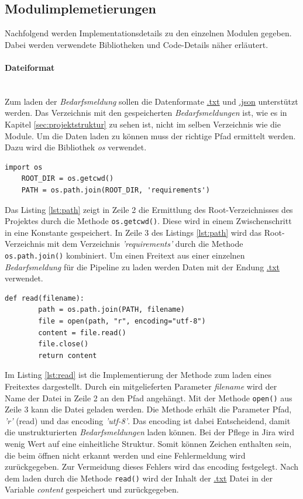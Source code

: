 \subsection{Modulimplemetierungen}
Nachfolgend werden Implementationsdetails zu den einzelnen Modulen gegeben. Dabei werden verwendete Bibliotheken und Code-Details näher erläutert.
\paragraph{Dateiformat}\mbox{}\\
Zum laden der \emph{Bedarfsmeldung} sollen die Datenformate \url{.txt} und \url{.json} unterstützt werden. Das Verzeichnis mit den gespeicherten \emph{Bedarfsmeldungen} ist, wie es in Kapitel \ref{sec:projektstruktur} zu sehen ist, nicht im selben Verzeichnis wie die Module. Um die Daten laden zu können muss der richtige Pfad ermittelt werden. Dazu wird die Bibliothek \emph{os} verwendet.
\begin{lstlisting}[caption={Teilimplementation des Moduls \emph{readRequirements.py}}, label=lst:path]
	import os
	ROOT_DIR = os.getcwd()
	PATH = os.path.join(ROOT_DIR, 'requirements') 
\end{lstlisting}
Das Listing \ref{lst:path} zeigt in Zeile 2 die Ermittlung des Root-Verzeichnisses des Projektes durch die Methode \lstinline{os.getcwd()}.
Diese wird in einem Zwischenschritt in eine Konstante gespeichert. In Zeile 3 des Listings \ref{lst:path} wird das Root-Verzeichnis mit dem Verzeichnis \emph{'requirements'} durch die Methode \lstinline{os.path.join()} kombiniert.
Um einen Freitext aus einer einzelnen \emph{Bedarfsmeldung} für die Pipeline zu laden werden Daten mit der Endung \url{.txt} verwendet.
\begin{lstlisting}[caption={Implementation der Methode read() des Moduls \emph{readRequirements.py}}, label=lst:read]
	def read(filename):
		path = os.path.join(PATH, filename)
		file = open(path, "r", encoding="utf-8")
		content = file.read()
		file.close()
		return content
\end{lstlisting}
Im Listing \ref{lst:read} ist die Implementierung der Methode zum laden eines Freitextes dargestellt. Durch ein mitgelieferten Parameter \emph{filename} wird der Name der Datei in Zeile 2 an den Pfad angehängt. Mit der Methode \lstinline{open()}
aus Zeile 3 kann die Datei geladen werden. Die Methode erhält die Parameter Pfad, \emph{'r'} (read) und das encoding \emph{'utf-8'}. Das encoding ist dabei Entscheidend, damit die unstrukturierten \emph{Bedarfsmeldungen} laden können. Bei der Pflege in Jira wird wenig Wert auf eine einheitliche Struktur. Somit können Zeichen enthalten sein, die beim öffnen nicht erkannt werden und eine Fehlermeldung wird zurückgegeben. Zur Vermeidung dieses Fehlers wird das encoding festgelegt. Nach dem laden durch die Methode \lstinline{read()} wird der Inhalt der \url{.txt} Datei in der Variable \emph{content} gespeichert und zurückgegeben.
